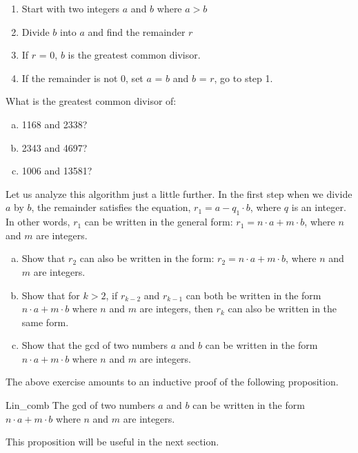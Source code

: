 \begin{enumerate}[1:]
\item
Start with two integers $a$ and $b$ where $a > b$
\item
Divide $b$ into $a$ and find the remainder $r$
\item
If $r$ = 0, $b$ is the greatest common divisor.
\item
If the remainder is not 0, set $a$ = $b$ and $b$ = $r$, go to step 1.
\end{enumerate}


\begin{exercise}{}
What is the greatest common divisor of:
\begin{enumerate}[(a)]
\item
1168 and 2338?
\item
2343 and 4697?
\item
1006 and 13581?
\end{enumerate}
\end{exercise} 

Let us analyze this algorithm just a little further.  In the first step when we divide $a$ by $b$, the remainder satisfies the equation,  $r_1 = a - q_1\cdot b$, where $q$ is an integer.  In other words, $r_1$ can be written in the general form:  $r_1 = n \cdot a + m \cdot b$, where $n$ and $m$ are integers.

\begin{exercise}{71}
\begin{enumerate}[(a)]
\item  
Show that $r_2$ can also be written in the form: $r_2 = n \cdot a + m \cdot b$, where $n$ and $m$ are integers.
\item
Show that for $k>2$, if $r_{k-2}$ and $r_{k-1}$ can both be written in the form  $n \cdot a + m \cdot b$ where $n$ and $m$ are integers, then $r_k$ can also be written in the same form.
\item
Show that the gcd of two numbers $a$ and $b$ can be written in the form $n \cdot a + m \cdot b$ where $n$ and $m$ are integers.
\end{enumerate}
\end{exercise}

The above exercise amounts to an inductive proof of the following proposition.

\begin{prop}{Lin_comb}
The gcd of two numbers $a$ and $b$ can be written in the form $n \cdot a + m \cdot b$ where $n$ and $m$ are integers.
\end{prop}
\noindent
This proposition will be useful in the next section.

